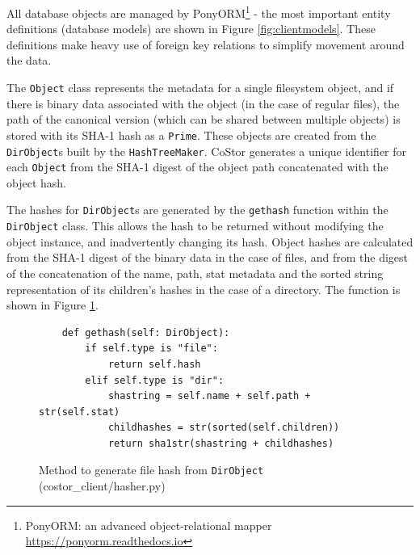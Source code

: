 \documentclass[bsc,frontabs,twoside,singlespacing,parskip,deptreport]{infthesis}     %
\begin{document}
All database objects are managed by PonyORM\footnote{PonyORM: an advanced object-relational mapper \url{https://ponyorm.readthedocs.io}}
- the most important entity definitions (database models) are shown in Figure \ref{fig:clientmodels}.
These definitions make heavy use of foreign key relations to simplify movement around the data.

The \texttt{Object} class represents the metadata for a single filesystem object, and if there is 
binary data associated with the object (in the case of regular files), the path of the canonical
version (which can be shared between multiple objects) is stored with its SHA-1 hash as a \texttt{Prime}.
These objects are created from the \texttt{DirObject}s built by the \texttt{HashTreeMaker}. CoStor
generates a unique identifier for each \texttt{Object} from the SHA-1 digest of the object path concatenated 
with the object hash.

The hashes for \texttt{DirObject}s are generated by the \texttt{gethash} function within the \texttt{DirObject} 
class. This allows the hash to be returned without modifying the object instance, and inadvertently changing its 
hash. Object hashes are calculated from the SHA-1 digest of the binary data in the case of files, and from the 
digest of the concatenation of the name, path, stat metadata and the sorted string representation of its 
children's hashes in the case of a directory. The function is shown in Figure \ref{fig:dirobjgethash}.

\begin{figure}
	\begin{verbatim}
	def gethash(self: DirObject):
        if self.type is "file":
            return self.hash
        elif self.type is "dir":
            shastring = self.name + self.path + str(self.stat)
            childhashes = str(sorted(self.children))
            return sha1str(shastring + childhashes)
	\end{verbatim}
	\caption{Method to generate file hash from \texttt{DirObject} (costor\_client/hasher.py)}
	\label{fig:dirobjgethash}
\end{figure}
\end{document}
